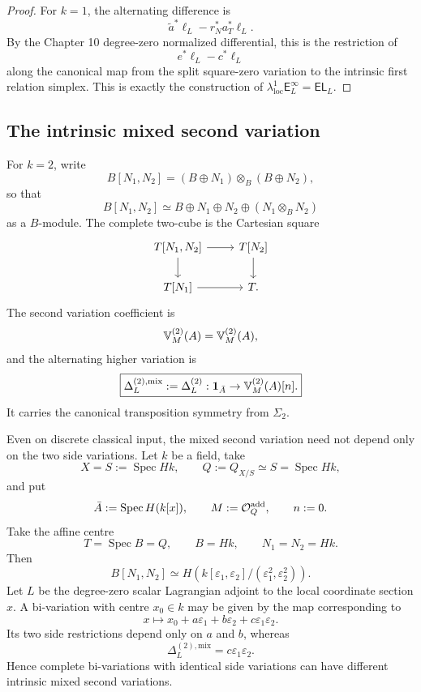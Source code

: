 \begin{proof}
For \(k=1\), the alternating difference is
\[
    \widetilde a^*\ell_L-r_N^*a_T^*\ell_L.
\]
By the Chapter 10 degree-zero normalized differential, this is the restriction of
\[
    e^*\ell_L-c^*\ell_L
\]
along the canonical map from the split square-zero variation to the intrinsic first relation simplex. This is exactly the construction of \(\lambda^1_{\mathrm{loc}}\mathsf E_L^\infty=\mathsf{EL}_L\).
\end{proof}

\subsection{The intrinsic mixed second variation}

For \(k=2\), write
\[
    B[N_1,N_2]
    =
    (B\oplus N_1)\otimes_B(B\oplus N_2),
\]
so that
\[
    B[N_1,N_2]
    \simeq
    B\oplus N_1\oplus N_2\oplus(N_1\otimes_BN_2)
\]
as a \(B\)-module. The complete two-cube is the Cartesian square
\[
\begin{tikzcd}
T[N_1,N_2] \arrow[r] \arrow[d]
& T[N_2] \arrow[d]
\\
T[N_1] \arrow[r]
& T.
\end{tikzcd}
\]
The second variation coefficient is
\[
    \mathbb V^{(2)}_M(A)
    =
    \mathbb V_M^{(2)}(A),
\]
and the alternating higher variation is
\[
    \boxed{
    \Delta_L^{(2),\mathrm{mix}}
    :=
    \Delta_L^{(2)}:
    \mathbf 1_{\bar A}\to\mathbb V^{(2)}_M(A)[n].
    }
\]
It carries the canonical transposition symmetry from \(\Sigma_2\).

\begin{proposition}
\label{prop:var-mixed-not-hessian}
Even on discrete classical input, the mixed second variation need not depend only on the two side variations. Let \(k\) be a field, take
\[
    X=S:=\operatorname{Spec}Hk,
    \qquad
    Q:=Q_{X/S}\simeq S=\operatorname{Spec}Hk,
\]
and put
\[
    \bar A:=\operatorname{Spec}H(k[x]),
    \qquad
    M:=\mathcal O^{\mathrm{add}}_Q,
    \qquad
    n:=0.
\]
Take the affine centre
\[
    T=\operatorname{Spec}B=Q,
    \qquad
    B=Hk,
    \qquad
    N_1=N_2=Hk.
\]
Then
\[
    B[N_1,N_2]
    \simeq
    H\!\left(
      k[\varepsilon_1,\varepsilon_2]/
      (\varepsilon_1^2,\varepsilon_2^2)
    \right).
\]
Let \(L\) be the degree-zero scalar Lagrangian adjoint to the local coordinate section \(x\). A bi-variation with centre \(x_0\in k\) may be given by the map corresponding to
\[
    x\longmapsto
    x_0+a\varepsilon_1+b\varepsilon_2+c\varepsilon_1\varepsilon_2.
\]
Its two side restrictions depend only on \(a\) and \(b\), whereas
\[
    \boxed{
    \Delta_L^{(2),\mathrm{mix}}
    =
    c\varepsilon_1\varepsilon_2.
    }
\]
Hence complete bi-variations with identical side variations can have different intrinsic mixed second variations.
\end{proposition}


